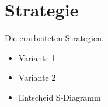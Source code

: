 %
%
\chapter{Strategie}\label{ch:strategie}
	Die erarbeiteten Strategien.
	\begin{itemize}
		\item Variante 1
		\item Variante 2
		\item Entscheid S-Diagramm
	\end{itemize}
	
	
	
